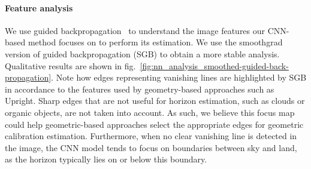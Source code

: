 \paragraph{Feature analysis} We use guided backpropagation~\cite{Springenberg2015} to understand the image features our CNN-based method focuses on to perform its estimation. We use the smoothgrad~\cite{Smilkov2017} version of guided backpropagation (SGB) to obtain a more stable analysis. Qualitative results are shown in fig.~\ref{fig:nn_analysis_smoothed-guided-back-propagation}. Note how edges representing vanishing lines are highlighted by SGB in accordance to the features used by geometry-based approaches such as Upright. Sharp edges that are not useful for horizon estimation, such as clouds or organic objects,  are not taken into account. As such, we believe this focus map could help geometric-based approaches select the appropriate edges for geometric calibration estimation. Furthermore, when no clear vanishing line is detected in the image, the CNN model tends to focus on boundaries between sky and land, as the horizon typically lies on or below this boundary.


